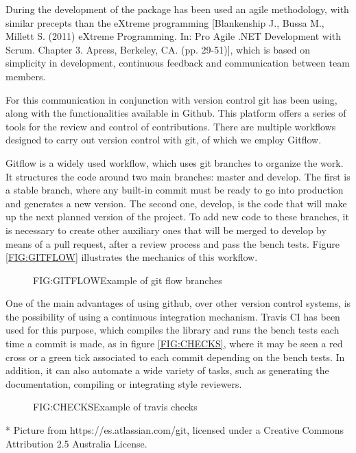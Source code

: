 During the development of the package has been used an agile methodology, with
similar precepts than the eXtreme programming [Blankenship J., Bussa M.,
Millett S. (2011) eXtreme Programming. In: Pro Agile .NET Development with
Scrum. Chapter 3. Apress, Berkeley, CA. (pp. 29-51)], which is based on
simplicity in development, continuous feedback and communication between
team members.

For this communication in conjunction with version control git has been using,
along with the functionalities available in Github. This platform offers a
series of tools for the review and control of contributions. There are multiple
workflows designed to carry out version control with git, of which we employ
Gitflow.

Gitflow is a widely used workflow, which uses git branches to organize the work.
It structures the code around two main branches: master and develop. The first
is a stable branch, where any built-in commit must be ready to go into
production and generates a new version. The second one, develop, is the code
that will make up the next planned version of the project. To add new code to
these branches, it is necessary to create other auxiliary ones that will be
merged to develop by means of a pull request, after a review process and pass
the bench tests. Figure \ref{FIG:GITFLOW} illustrates the mechanics of this
workflow.


\begin{figure}[Example of git flow branches]{FIG:GITFLOW}{Example of git flow branches}
\end{figure}


One of the main advantages of using github, over other version control systems,
is the possibility of using a continuous integration mechanism. Travis CI has
been used for this purpose, which compiles the library and runs the bench tests
each time a commit is made, as in figure \ref{FIG:CHECKS}, where it may be seen a red cross
or a green tick associated to each commit depending on the bench tests. In
addition, it can also automate a wide variety of tasks, such as generating the
documentation, compiling or integrating style reviewers.

\begin{figure}[Example of travis checks]{FIG:CHECKS}{Example of travis checks}
\end{figure}

* Picture from https://es.atlassian.com/git, licensed under a Creative Commons Attribution 2.5 Australia License.
